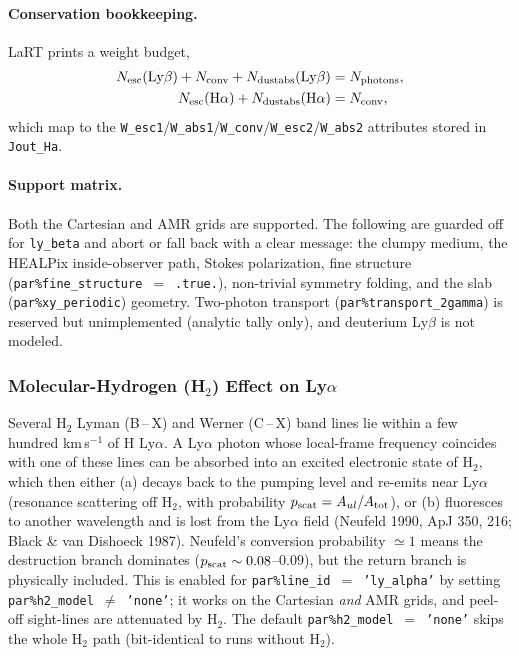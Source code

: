 \documentclass[english,a4paper]{my_memo}
\newcommand{\parm}[1]{\texttt{par\%#1}}
\begin{document}
\paragraph{Conservation bookkeeping.}
LaRT prints a weight budget,
\begin{align}
  N_{\rm esc}({\rm Ly}\beta) + N_{\rm conv} + N_{\rm dustabs}({\rm Ly}\beta)
    &= N_{\rm photons}, \\
  N_{\rm esc}({\rm H}\alpha) + N_{\rm dustabs}({\rm H}\alpha) &= N_{\rm conv},
\end{align}
which map to the \texttt{W\_esc1}/\texttt{W\_abs1}/\texttt{W\_conv}/\texttt{W\_esc2}/\texttt{W\_abs2}
attributes stored in \texttt{Jout\_Ha}.

\paragraph{Support matrix.}
Both the Cartesian and AMR grids are supported. The following are guarded off
for \texttt{ly\_beta} and abort or fall back with a clear message: the clumpy
medium, the HEALPix inside-observer path, Stokes polarization, fine structure
(\parm{fine\_structure}~$=$~\texttt{.true.}), non-trivial symmetry folding, and
the slab (\parm{xy\_periodic}) geometry. Two-photon transport
(\parm{transport\_2gamma}) is reserved but unimplemented (analytic tally only),
and deuterium Ly$\beta$ is not modeled.

\subsubsection{Molecular-Hydrogen (H\texorpdfstring{$_2$}{2}) Effect on Ly\texorpdfstring{$\alpha$}{alpha}}
\label{sec:h2}

Several H$_2$ Lyman (B\,--\,X) and Werner (C\,--\,X) band lines lie within a few
hundred km\,s$^{-1}$ of H Ly$\alpha$. A Ly$\alpha$ photon whose local-frame
frequency coincides with one of these lines can be absorbed into an excited
electronic state of H$_2$, which then either (a) decays back to the pumping level
and re-emits near Ly$\alpha$ (resonance scattering off H$_2$, with probability
$p_{\rm scat}=A_{ul}/A_{\rm tot}$), or (b) fluoresces to another wavelength and is
lost from the Ly$\alpha$ field (Neufeld 1990, ApJ 350, 216; Black \& van Dishoeck
1987). Neufeld's conversion probability $\simeq1$ means the destruction branch
dominates ($p_{\rm scat}\sim0.08$--$0.09$), but the return branch is physically
included. This is enabled for \parm{line\_id}~$=$~\texttt{'ly\_alpha'} by setting
\parm{h2\_model}~$\ne$~\texttt{'none'}; it works on the Cartesian \emph{and} AMR
grids, and peel-off sight-lines are attenuated by H$_2$. The default
\parm{h2\_model}~$=$~\texttt{'none'} skips the whole H$_2$ path (bit-identical to
runs without H$_2$).
\end{document}
